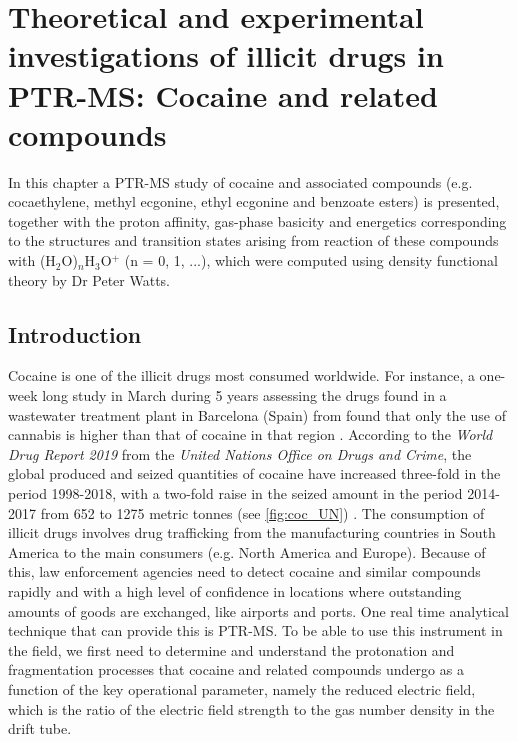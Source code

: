 
\chapter{Theoretical and experimental investigations of illicit drugs in PTR-MS: Cocaine and related compounds}
 
In this chapter a PTR-MS study of cocaine and associated compounds (e.g. cocaethylene, methyl ecgonine, ethyl ecgonine and benzoate esters) is presented, together with the proton affinity, gas-phase basicity and energetics corresponding to the structures and transition states arising from reaction of these compounds with (H$_2$O)$_n$H$_3$O$^+$ (n = 0, 1, ...), which were computed using density functional theory by Dr Peter Watts.
 
\section{Introduction}


Cocaine is one of the illicit   drugs most consumed  worldwide.
%
For instance, a one-week long study in March during 5 years assessing the drugs found in a wastewater treatment plant in Barcelona (Spain) from \citeauthor{mastroianni2017five} found that only the use of cannabis is higher than that of cocaine in that region \cite{mastroianni2017five}.
%
According to the \textit{World Drug Report 2019} from the \textit{United Nations Office on Drugs and Crime}, the global produced and seized quantities of cocaine have increased three-fold in the period 1998-2018, with a two-fold raise in the seized amount in the period 2014-2017 from 652 to 1275 metric tonnes (see \autoref{fig:coc_UN}) \cite{united2019world}.
%
The consumption of illicit drugs involves drug trafficking from the manufacturing countries in South America to the main consumers (e.g. North America and Europe).
%
Because of this, law enforcement agencies need to  detect cocaine and similar compounds rapidly and with a high level of confidence in locations where outstanding amounts of goods are exchanged, like airports and ports. One real time analytical technique that can provide this is PTR-MS.  To be able to use this instrument in the field, we first need to determine and understand the protonation and fragmentation processes that cocaine and related compounds undergo as a function of the key operational parameter, namely the reduced electric field, which is the ratio of the electric field strength to the gas number density in the drift tube.


